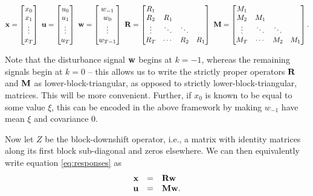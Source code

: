 \documentclass[11pt]{article}
\numberwithin{equation}{section}
\begin{document}
\begin{equation}
\mathbf{x} = \begin{bmatrix} x_0 \\ x_1 \\ \vdots \\ x_{T} \end{bmatrix} \ \mathbf{u} = \begin{bmatrix} u_0 \\ u_1 \\ \vdots \\ u_{T} \end{bmatrix} \ \mathbf{w} = \begin{bmatrix} w_{-1} \\ w_0 \\ \vdots \\ w_{T-1}\end{bmatrix} \ \mathbf{R} = \begin{bmatrix} R_1 & & & \\ R_2 & R_1 & & \\ \vdots & \ddots & \ddots & \\  R_{T} & \cdots & R_2 & R_1 \end{bmatrix} \ \mathbf{M} = \begin{bmatrix} M_1 & & & \\ M_2 & M_1 & & \\ \vdots & \ddots & \ddots & \\  M_{T} & \cdots & M_2 & M_1 \end{bmatrix} \label{eq:definitions}.
\end{equation}

Note that the disturbance signal $\mathbf{w}$ begins at $k=-1$, whereas the remaining signals begin at $k=0$ -- this allows us to write the strictly proper operators $\mathbf{R}$ and $\mathbf{M}$ as lower-block-triangular, as opposed to strictly lower-block-triangular, matrices.  This will be more convenient.  Further, if $x_0$ is known to be equal to some value $\xi$, this can be encoded in the above framework by making $w_{-1}$ have mean $\xi$ and covariance $0$.

Now let $Z$ be the block-downshift operator, i.e., a matrix with identity matrices along its first block sub-diagonal and zeros elsewhere.  We can then equivalently write equation \eqref{eq:responses} as
\begin{equation}
\begin{array}{rcl}
\mathbf{x} &=& \mathbf{R} \mathbf{w} \\
\mathbf{u} &=& \mathbf{M} \mathbf{w}.
\label{eq:toep_resp}
\end{array}
\end{equation}
\end{document}
